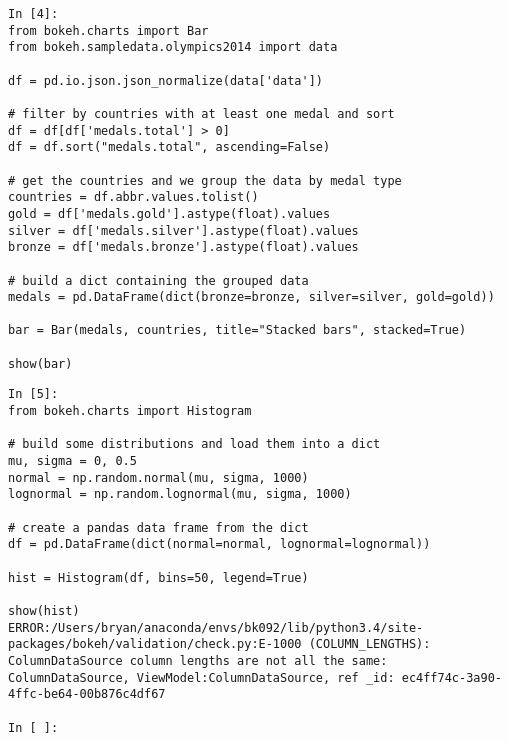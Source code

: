 \begin{framed}
\begin{verbatim}	
In [4]:
from bokeh.charts import Bar
from bokeh.sampledata.olympics2014 import data

df = pd.io.json.json_normalize(data['data'])

# filter by countries with at least one medal and sort
df = df[df['medals.total'] > 0]
df = df.sort("medals.total", ascending=False)

# get the countries and we group the data by medal type
countries = df.abbr.values.tolist()
gold = df['medals.gold'].astype(float).values
silver = df['medals.silver'].astype(float).values
bronze = df['medals.bronze'].astype(float).values

# build a dict containing the grouped data
medals = pd.DataFrame(dict(bronze=bronze, silver=silver, gold=gold))

bar = Bar(medals, countries, title="Stacked bars", stacked=True)

show(bar)
\end{verbatim}
\end{framed}
\begin{framed}
\begin{verbatim}
In [5]:
from bokeh.charts import Histogram

# build some distributions and load them into a dict
mu, sigma = 0, 0.5
normal = np.random.normal(mu, sigma, 1000)
lognormal = np.random.lognormal(mu, sigma, 1000)

# create a pandas data frame from the dict
df = pd.DataFrame(dict(normal=normal, lognormal=lognormal))

hist = Histogram(df, bins=50, legend=True)

show(hist)
ERROR:/Users/bryan/anaconda/envs/bk092/lib/python3.4/site-packages/bokeh/validation/check.py:E-1000 (COLUMN_LENGTHS): ColumnDataSource column lengths are not all the same: ColumnDataSource, ViewModel:ColumnDataSource, ref _id: ec4ff74c-3a90-4ffc-be64-00b876c4df67
	
In [ ]:
\end{verbatim}
\end{framed}

